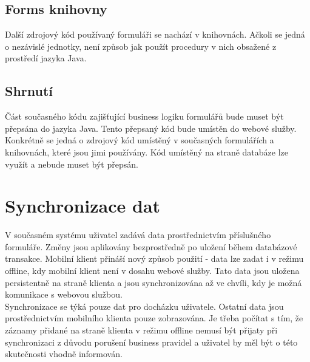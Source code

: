 \documentclass{diplomka}
\begin{document}
\subsection{Forms knihovny}
Další zdrojový kód používaný formuláři se nachází v knihovnách. Ačkoli se jedná o nezávislé jednotky, není způsob jak použít procedury v nich obsažené z prostředí jazyka Java.

\subsection{Shrnutí}
Část současného kódu zajišťující business logiku formulářů bude muset být přepsána do jazyka Java. Tento přepsaný kód bude umístěn do webové služby. Konkrétně se jedná o zdrojový kód umístěný v současných formulářích a knihovnách, které jsou jimi používány. Kód umístěný na straně databáze lze využít a nebude muset být přepsán.

\newpage
\section{Synchronizace dat}
V současném systému uživatel zadává data prostřednictvím příslušného formuláře. Změny jsou aplikovány bezprostředně po uložení během databázové transakce. Mobilní klient přináší nový způsob použití - data lze zadat i v režimu offline, kdy mobilní klient není v dosahu webové služby. Tato data jsou uložena persistentně na straně klienta a jsou synchronizována až ve chvíli, kdy je možná komunikace s webovou službou.\\ \indent
Synchronizace se týká pouze dat pro docházku uživatele. Ostatní data jsou prostřednictvím mobilního klienta pouze zobrazována. Je třeba počítat s tím, že záznamy přidané na straně klienta v režimu offline nemusí být přijaty při synchronizaci z důvodu porušení business pravidel a uživatel by měl být o této skutečnosti vhodně informován.
\end{document}
